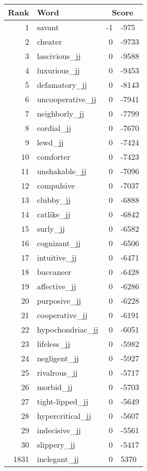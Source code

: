 \begin{longtable}[!htbp]{| rlr@{.}l |}
    \hline
    \textbf{Rank} & \textbf{Word} & \multicolumn{2}{c|}{\textbf{Score}} \\
    \hline
    \endhead
    1 & savant & -1 & -975 \\
    2 & cheater & 0 & -9733 \\
    3 & lascivious\_jj & 0 & -9588 \\
    4 & luxurious\_jj & 0 & -9453 \\
    5 & defamatory\_jj & 0 & -8143 \\
    6 & uncooperative\_jj & 0 & -7941 \\
    7 & neighborly\_jj & 0 & -7799 \\
    8 & cordial\_jj & 0 & -7670 \\
    9 & lewd\_jj & 0 & -7424 \\
    10 & comforter & 0 & -7423 \\
    11 & unshakable\_jj & 0 & -7096 \\
    12 & compulsive & 0 & -7037 \\
    13 & clubby\_jj & 0 & -6888 \\
    14 & catlike\_jj & 0 & -6842 \\
    15 & surly\_jj & 0 & -6582 \\
    16 & cognizant\_jj & 0 & -6506 \\
    17 & intuitive\_jj & 0 & -6471 \\
    18 & buccaneer & 0 & -6428 \\
    19 & affective\_jj & 0 & -6286 \\
    20 & purposive\_jj & 0 & -6228 \\
    21 & cooperative\_jj & 0 & -6191 \\
    22 & hypochondriac\_jj & 0 & -6051 \\
    23 & lifeless\_jj & 0 & -5982 \\
    24 & negligent\_jj & 0 & -5927 \\
    25 & rivalrous\_jj & 0 & -5717 \\
    26 & morbid\_jj & 0 & -5703 \\
    27 & tight-lipped\_jj & 0 & -5649 \\
    28 & hypercritical\_jj & 0 & -5607 \\
    29 & indecisive\_jj & 0 & -5561 \\
    30 & slippery\_jj & 0 & -5417 \\
    1831 & inelegant\_jj & 0 & 5370 \\

\end{longtable}
